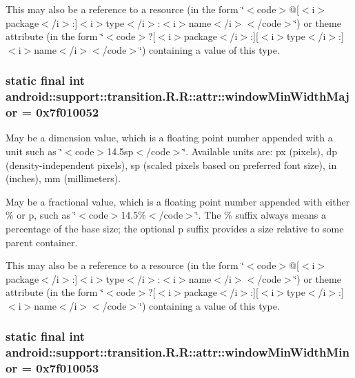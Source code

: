 This may also be a reference to a resource (in the form \char`\"{}$<$code$>$@\mbox{[}$<$i$>$package$<$/i$>$:\mbox{]}$<$i$>$type$<$/i$>$:$<$i$>$name$<$/i$>$$<$/code$>$\char`\"{}) or theme attribute (in the form \char`\"{}$<$code$>$?\mbox{[}$<$i$>$package$<$/i$>$:\mbox{]}\mbox{[}$<$i$>$type$<$/i$>$:\mbox{]}$<$i$>$name$<$/i$>$$<$/code$>$\char`\"{}) containing a value of this type. \hypertarget{classandroid_1_1support_1_1transition_1_1_r_1_1attr_b468799edd3ee0db5d72fecc66b24689}{
\subsubsection[{windowMinWidthMajor}]{\setlength{\rightskip}{0pt plus 5cm}static final int android::support::transition.R.R::attr::windowMinWidthMajor = 0x7f010052}}
\label{classandroid_1_1support_1_1transition_1_1_r_1_1attr_b468799edd3ee0db5d72fecc66b24689}


May be a dimension value, which is a floating point number appended with a unit such as \char`\"{}$<$code$>$14.5sp$<$/code$>$\char`\"{}. Available units are: px (pixels), dp (density-independent pixels), sp (scaled pixels based on preferred font size), in (inches), mm (millimeters). 

May be a fractional value, which is a floating point number appended with either \% or p, such as \char`\"{}$<$code$>$14.5\%$<$/code$>$\char`\"{}. The \% suffix always means a percentage of the base size; the optional p suffix provides a size relative to some parent container. 

This may also be a reference to a resource (in the form \char`\"{}$<$code$>$@\mbox{[}$<$i$>$package$<$/i$>$:\mbox{]}$<$i$>$type$<$/i$>$:$<$i$>$name$<$/i$>$$<$/code$>$\char`\"{}) or theme attribute (in the form \char`\"{}$<$code$>$?\mbox{[}$<$i$>$package$<$/i$>$:\mbox{]}\mbox{[}$<$i$>$type$<$/i$>$:\mbox{]}$<$i$>$name$<$/i$>$$<$/code$>$\char`\"{}) containing a value of this type. \hypertarget{classandroid_1_1support_1_1transition_1_1_r_1_1attr_1f78eac5cc044aec9b120c5d174c11e5}{
\subsubsection[{windowMinWidthMinor}]{\setlength{\rightskip}{0pt plus 5cm}static final int android::support::transition.R.R::attr::windowMinWidthMinor = 0x7f010053}}
\label{classandroid_1_1support_1_1transition_1_1_r_1_1attr_1f78eac5cc044aec9b120c5d174c11e5}


